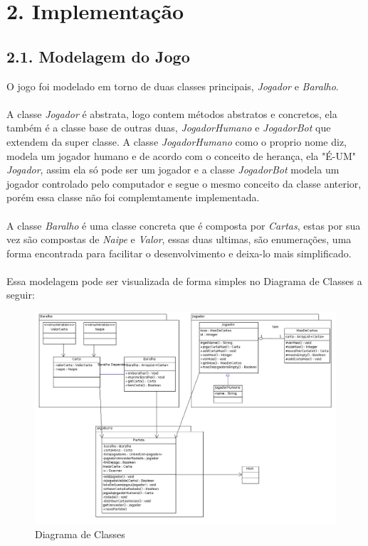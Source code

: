 \documentclass[12pt, a4paper]{article}
\begin{document}
\section*{2. Implementação}
  \subsection*{2.1. Modelagem do Jogo}
  O jogo foi modelado em torno de duas classes principais, \textit{Jogador} e \textit{Baralho}.
  \\\\
  A classe \textit{Jogador} é abstrata, logo contem métodos abstratos e concretos, ela também é a classe base de outras duas, \textit{JogadorHumano} e \textit{JogadorBot} que extendem da super classe. A classe \textit{JogadorHumano} como o proprio nome diz, modela um jogador humano e de acordo com o conceito de herança, ela "É-UM" \textit{Jogador}, assim ela só pode ser um jogador  e a classe \textit{JogadorBot} modela um jogador controlado pelo computador e segue o mesmo conceito da classe anterior, porém essa classe não foi complemtamente implementada.\\\\
  A classe \textit{Baralho} é uma classe concreta que é composta por \textit{Cartas}, estas por sua vez são compostas de \textit{Naipe} e \textit{Valor}, essas duas ultimas, são enumerações, uma forma encontrada para facilitar o desenvolvimento e deixa-lo mais simplificado.
  \\\\
  Essa modelagem pode ser visualizada de forma simples no Diagrama de Classes a seguir:

  \begin{figure}[!htb]
   \centering
   \includegraphics[scale=0.4]{DiagramadeClassesBurro}
   \caption{Diagrama de Classes}
   \label{Rotulo}
  \end{figure}
\end{document}
